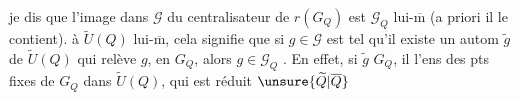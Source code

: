  je dis que l'image dans $\mathcal G$ du centralisateur  de $r(G_Q)$ est $\mathcal G_Q$ lui-$\overline{\mathrm m}$ (a priori il le contient).
 à $\widetilde U(Q)$ lui-$\overline{\mathrm m}$, cela signifie que  si $g\in\mathcal G$ est tel qu'il existe un autom $\widetilde g$ de $\widetilde U(Q)$ qui relève $g$, en     $G_Q$, alors $g\in\mathcal G_Q$ . En effet, si $\widetilde g$    $G_Q$, il  l'ens des pts fixes de $G_Q$ dans $\widetilde U(Q)$, qui est réduit   $\unsure{\widetilde Q|\overline Q}$
